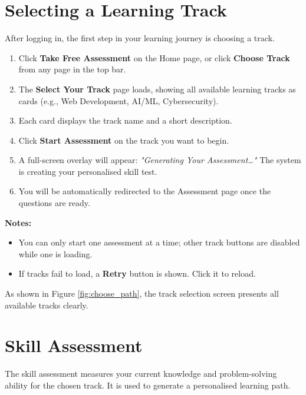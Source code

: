 \documentclass{FastFyp}
\begin{document}
\section{Selecting a Learning Track}

After logging in, the first step in your learning journey is choosing a track.

\begin{enumerate}
    \item Click \textbf{Take Free Assessment} on the Home page, or click \textbf{Choose Track} from any page in the top bar.
    \item The \textbf{Select Your Track} page loads, showing all available learning tracks as cards (e.g., Web Development, AI/ML, Cybersecurity).
    \item Each card displays the track name and a short description.
    \item Click \textbf{Start Assessment} on the track you want to begin.
    \item A full-screen overlay will appear: \textit{"Generating Your Assessment\ldots"} The system is creating your personalised skill test.
    \item You will be automatically redirected to the Assessment page once the questions are ready.
\end{enumerate}

\noindent\textbf{Notes:}
\begin{itemize}
    \item You can only start one assessment at a time; other track buttons are disabled while one is loading.
    \item If tracks fail to load, a \textbf{Retry} button is shown. Click it to reload.
\end{itemize}

As shown in Figure \ref{fig:choose_path}, the track selection screen presents all available tracks clearly.

\section{Skill Assessment}

The skill assessment measures your current knowledge and problem-solving ability for the chosen track. It is used to generate a personalised learning path.
\end{document}

